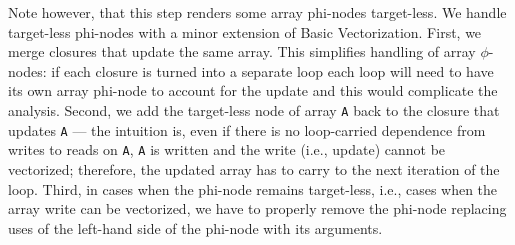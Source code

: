 \documentclass[sigconf, screen, natbib=false, dvipsnames, table]{acmart}
\theoremstyle{definition}
\begin{document}
Note however, that this step renders some array phi-nodes target-less. We handle target-less phi-nodes with a minor extension of Basic Vectorization. 
First, we merge closures that update the same array. This simplifies handling of array $\phi$-nodes: if each closure is turned into a separate loop
each loop will need to have its own array phi-node to account for the update and this would complicate the analysis.
Second, we add the target-less node of array \texttt{A} back to the closure that updates \texttt{A} ---
the intuition is, even if there is no loop-carried dependence from writes to reads on \texttt{A}, \texttt{A} is written and the write (i.e., update) cannot be vectorized; 
therefore, the updated array has to carry to the next iteration of the loop. Third, in cases when the phi-node remains target-less, i.e., cases when the
array write can be vectorized, we have to properly remove the phi-node replacing uses of the left-hand side of the phi-node with its arguments.

\end{document}
